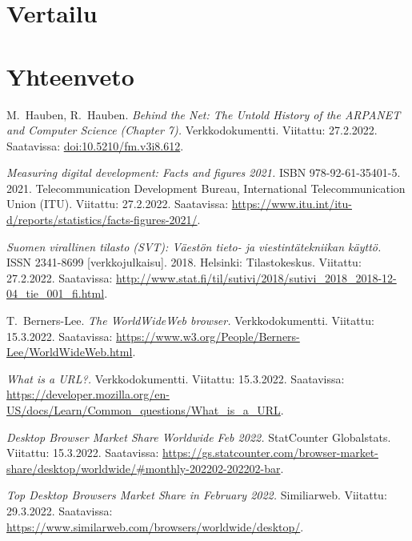 \documentclass[finnish, 12pt, a4paper, elec, utf8, a-1b, online]{aaltothesis}
\begin{document}
\clearpage


\section{Vertailu}


\clearpage

\section{Yhteenveto}


\clearpage


\thesisbibliography
\begin{thebibliography}{99}

    M.\ Hauben, R.\ Hauben.
    \textit{Behind the Net: The Untold History of the ARPANET and Computer Science (Chapter 7).}
    Verkkodokumentti.
    Viitattu: 27.2.2022.
    Saatavissa: \url{doi:10.5210/fm.v3i8.612}.

    \textit{Measuring digital development: Facts and figures 2021.}
    ISBN 978-92-61-35401-5.
    2021.
    Telecommunication Development Bureau, International Telecommunication Union (ITU).
    Viitattu: 27.2.2022.
    Saatavissa: \url{https://www.itu.int/itu-d/reports/statistics/facts-figures-2021/}.

    \textit{Suomen virallinen tilasto (SVT): Väestön tieto- ja viestintätekniikan käyttö.}
    ISSN 2341-8699 [verkkojulkaisu].
    2018.
    Helsinki: Tilastokeskus.
    Viitattu: 27.2.2022.
    Saatavissa: \url{http://www.stat.fi/til/sutivi/2018/sutivi_2018_2018-12-04_tie_001_fi.html}.

    T.\ Berners-Lee.
    \textit{The WorldWideWeb browser.}
    Verkkodokumentti.
    Viitattu: 15.3.2022.
    Saatavissa: \url{https://www.w3.org/People/Berners-Lee/WorldWideWeb.html}.

    \textit{What is a URL?.}
    Verkkodokumentti.
    Viitattu: 15.3.2022.
    Saatavissa: \url{https://developer.mozilla.org/en-US/docs/Learn/Common_questions/What_is_a_URL}.

    \textit{Desktop Browser Market Share Worldwide Feb 2022.}
    StatCounter Globalstats.
    Viitattu: 15.3.2022.
    Saatavissa: \url{https://gs.statcounter.com/browser-market-share/desktop/worldwide/#monthly-202202-202202-bar}.

    \textit{Top Desktop Browsers Market Share in February 2022.}
    Similiarweb.
    Viitattu: 29.3.2022.
    Saatavissa: \url{https://www.similarweb.com/browsers/worldwide/desktop/}.


\end{thebibliography}
\end{document}
